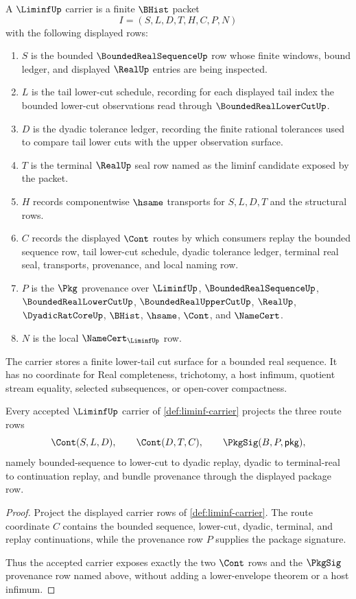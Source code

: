 \begin{definition}
\label{def:liminf-carrier}
A $\LiminfUp$ carrier is a finite $\BHist$ packet
$$
I=(S,L,D,T,H,C,P,N)
$$
with the following displayed rows:
\begin{enumerate}
\item $S$ is the bounded $\BoundedRealSequenceUp$ row whose finite windows, bound ledger, and displayed $\RealUp$ entries are being inspected.
\item $L$ is the tail lower-cut schedule, recording for each displayed tail index the bounded lower-cut observations read through $\BoundedRealLowerCutUp$.
\item $D$ is the dyadic tolerance ledger, recording the finite rational tolerances used to compare tail lower cuts with the upper observation surface.
\item $T$ is the terminal $\RealUp$ seal row named as the liminf candidate exposed by the packet.
\item $H$ records componentwise $\hsame$ transports for $S,L,D,T$ and the structural rows.
\item $C$ records the displayed $\Cont$ routes by which consumers replay the bounded sequence row, tail lower-cut schedule, dyadic tolerance ledger, terminal real seal, transports, provenance, and local naming row.
\item $P$ is the $\Pkg$ provenance over $\LiminfUp$, $\BoundedRealSequenceUp$, $\BoundedRealLowerCutUp$, $\BoundedRealUpperCutUp$, $\RealUp$, $\DyadicRatCoreUp$, $\BHist$, $\hsame$, $\Cont$, and $\NameCert$.
\item $N$ is the local $\NameCert_{\LiminfUp}$ row.
\end{enumerate}
The carrier stores a finite lower-tail cut surface for a bounded real sequence. It has no coordinate for Real completeness, trichotomy, a host infimum, quotient stream equality, selected subsequences, or open-cover compactness.
\end{definition}

\begin{lemma}
\label{lem:liminf-carrier-route-rows}
Every accepted $\LiminfUp$ carrier of \autoref{def:liminf-carrier} projects the three route rows
$$
\Cont(S,L,D),\qquad \Cont(D,T,C),\qquad \PkgSig(B,P,\mathsf{pkg}),
$$
namely bounded-sequence to lower-cut to dyadic replay, dyadic to terminal-real to continuation replay, and bundle provenance through the displayed package row.
\end{lemma}
\begin{proof}
Project the displayed carrier rows of \autoref{def:liminf-carrier}. The route coordinate $C$ contains the bounded sequence, lower-cut, dyadic, terminal, and replay continuations, while the provenance row $P$ supplies the package signature.

Thus the accepted carrier exposes exactly the two $\Cont$ rows and the $\PkgSig$ provenance row named above, without adding a lower-envelope theorem or a host infimum.
\end{proof}

